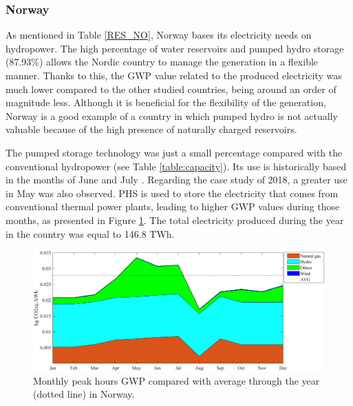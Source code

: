 {{ 

\subsubsection{Norway}
As mentioned in Table \ref{RES_NO}, Norway bases its electricity needs on hydropower. The high percentage of water reservoirs and pumped hydro storage {(87.93\%)} allows the Nordic country to manage the generation in a flexible manner.  Thanks to this, the GWP value related to the produced electricity was much lower compared to the other studied countries, {being around an order of magnitude less}. Although it is beneficial for the flexibility of the generation, Norway is a good example of a country in which pumped hydro is not actually valuable because of the high presence of naturally charged reservoirs. 

The pumped storage technology was just a small percentage compared with the conventional hydropower (see Table \ref{table:capacity}). Its use is historically based in the months of June and July \cite{Kougias2017PumpedHorse}. Regarding the case study of 2018, a greater use in May was also observed. PHS is used to store the electricity that comes from conventional thermal power plants, leading to higher GWP values during those months, as presented in Figure \ref{GWP_NO}. The total electricity produced during the year in the country was equal to 146.8 TWh.

 \begin{table}[htbp]
\centering
\caption{Percentage of resources used during peak and off-peak hours in Norway \cite{Entso-eProduction}.}
\label{RES_NO} 
\end{table}


\begin{figure}[htbp]
	\centering
	\includegraphics[width=1\textwidth]{ChapterLCA/Images/GWP_plots/Norway_GWP.png}
	\caption{Monthly peak hours GWP compared with average through the year (dotted line) in Norway.}
	\label{GWP_NO}
\end{figure}

}}
